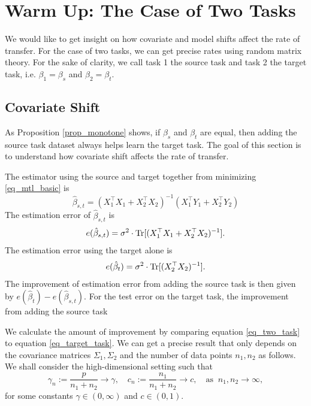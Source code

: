 \section{Warm Up: The Case of Two Tasks}\label{sec_defspike}


We would like to get insight on how covariate and model shifts affect the rate of transfer.
For the case of two tasks, we can get precise rates using random matrix theory.
For the sake of clarity, we call task 1 the source task and task 2 the target task,
i.e. $\beta_1 = \beta_s$ and $\beta_2 = \beta_t$.

\subsection{Covariate Shift}

As Proposition \ref{prop_monotone} shows, if $\beta_s$ and $\beta_t$ are equal, then adding the source task dataset always helps learn the target task.
The goal of this section is to understand how covariate shift affects the rate of transfer. 

The estimator using the source and target together from minimizing \eqref{eq_mtl_basic} is
\[ \hat{\beta}_{s,t} = (X_1^{\top} X_1 + X_2^{\top} X_2)^{-1} (X_1^{\top}Y_1 + X_2^{\top}Y_2)\]
The estimation error of $\hat{\beta}_{s,t}$ is
\begin{align}\label{eq_two_task}
  e(\hat{\beta}_{s,t}) = \sigma^2 \cdot \operatorname{Tr}[(X_1^{\top}X_1 + X_2^{\top} X_2)^{-1}].
\end{align}
The estimation error using the target alone is
\begin{align}\label{eq_target_task}
	e(\hat{\beta}_t) = \sigma^2 \cdot \operatorname{Tr}[(X_2^{\top} X_2)^{-1}].
\end{align}
The improvement of estimation error from adding the source task is then given by
$e(\hat{\beta}_t) - e(\hat{\beta}_{s,t})$.
For the test error on the target task, the improvement from adding the source task

We calculate the amount of improvement by comparing equation \eqref{eq_two_task} to equation \eqref{eq_target_task}.
We can get a precise result that only depends on the covariance matrices $\Sigma_1, \Sigma_2$ and the number of data points $n_1, n_2$ as follows.
We shall consider the high-dimensional setting such that
$$\gamma_n:= \frac{p} {n_1 + n_2} \to \gamma,\quad c_n:= \frac{n_1}{n_1 + n_2} \to c, \quad \text{as } \ n_1, n_2\to \infty, $$
for some constants $\gamma\in (0,\infty)$ and $c \in (0,1)$.

